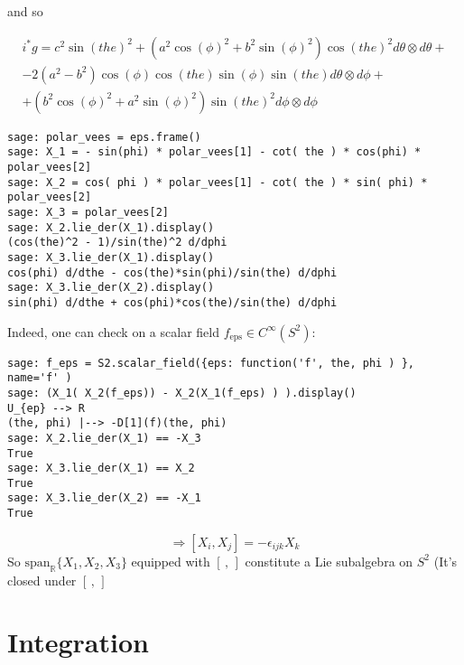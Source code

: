 \documentclass[10pt, twoside]{amsart}
\newcommand{\questionhead}[1]
  {\bigskip\bigskip
   \noindent{\small\bf Question #1.}
   \bigskip}
\begin{document}
\begin{multicols*}{2}
and so

\[
\boxed{ \begin{gathered}
 i^* g = c^{2} \sin\left(\mathit{the}\right)^{2} + {\left(a^{2} \cos\left(\phi\right)^{2} + b^{2} \sin\left(\phi\right)^{2}\right)} \cos\left(\mathit{the}\right)^{2} d\theta \otimes d\theta + \\
-2 {\left(a^{2} - b^{2}\right)} \cos\left(\phi\right) \cos\left(\mathit{the}\right) \sin\left(\phi\right) \sin\left(\mathit{the}\right) d\theta \otimes d\phi +  \\
 + {\left(b^{2} \cos\left(\phi\right)^{2} + a^{2} \sin\left(\phi\right)^{2}\right)} \sin\left(\mathit{the}\right)^{2} d\phi \otimes d\phi 
\end{gathered} }
\]

\questionhead{}

{\small
\begin{verbatim}
sage: polar_vees = eps.frame()
sage: X_1 = - sin(phi) * polar_vees[1] - cot( the ) * cos(phi) * polar_vees[2]
sage: X_2 = cos( phi ) * polar_vees[1] - cot( the ) * sin( phi) * polar_vees[2]
sage: X_3 = polar_vees[2]
sage: X_2.lie_der(X_1).display()
(cos(the)^2 - 1)/sin(the)^2 d/dphi
sage: X_3.lie_der(X_1).display()
cos(phi) d/dthe - cos(the)*sin(phi)/sin(the) d/dphi
sage: X_3.lie_der(X_2).display()
sin(phi) d/dthe + cos(phi)*cos(the)/sin(the) d/dphi
\end{verbatim}
}

Indeed, one can check on a scalar field $f_{\text{eps}} \in C^{\infty}(S^2)$:
{\small
\begin{verbatim}
sage: f_eps = S2.scalar_field({eps: function('f', the, phi ) }, name='f' )
sage: (X_1( X_2(f_eps)) - X_2(X_1(f_eps) ) ).display()
U_{ep} --> R
(the, phi) |--> -D[1](f)(the, phi)
sage: X_2.lie_der(X_1) == -X_3
True
sage: X_3.lie_der(X_1) == X_2
True
sage: X_3.lie_der(X_2) == -X_1
True
\end{verbatim}
}

\[
\Longrightarrow \boxed{ [X_i, X_j] = -\epsilon_{ijk}X_k }
\]
So $\text{span}_{\mathbb{R}} \lbrace X_1,X_2,X_3 \rbrace$ equipped with $[ \, , \, ]$ constitute a Lie subalgebra on $S^2$ (It's closed under $[ \, , \, ]$

\section{Integration}

\subsection{}


\end{multicols*}
\end{document}
